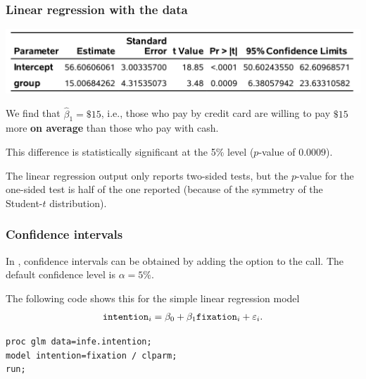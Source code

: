 \documentclass{beamer}
\begin{document}
\begin{frame}[fragile]
\frametitle{Linear regression with the  data}
\begin{center}
\includegraphics[width =0.9\linewidth]{img/c2/slides3-e14}
\end{center}
\bi
\item We find that $\widehat{\beta}_1=\$15$, i.e., those who pay by credit card are willing to pay $\$15$ more \textbf{on average} than those who pay with cash. 
\item This difference is statistically significant at the 5\% level ($p$-value of $0.0009$).
\item The linear regression output only reports two-sided tests, but the $p$-value for the one-sided test is half of the one reported (because of the symmetry of the Student-$t$ distribution).
\ei
\end{frame}
 
 \begin{frame}[fragile]
\frametitle{Confidence intervals}
\bi
\item 
In \SASlang, confidence intervals can be obtained by adding the option  to the  call. The default confidence level is $\alpha=5\%$.
\item The following code shows this for the simple linear regression model 
\ei
\begin{align*}
\texttt{intention}_i = \beta_0 + \beta_1 \texttt{fixation}_i + \varepsilon_i.
\end{align*}

\begin{tcolorbox}[colback=white, colframe=hecblue, title=\SASlang code to fit the regression model with the \code{glm} procedure]
\begin{verbatim}
proc glm data=infe.intention;
model intention=fixation / clparm;
run;
\end{verbatim}
\end{tcolorbox}


\end{frame}
\end{document}

